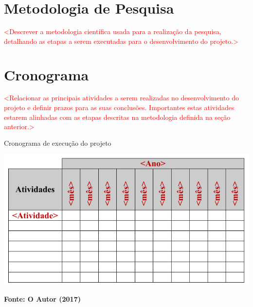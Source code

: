 \documentclass[
	12pt,				%
	openright,			%
	oneside,			%
	a4paper,			%
	chapter=TITLE,		%
	english,			%
	french,				%
	spanish,			%
	brazil				%
	]{abntex2}
\begin{document}
\chapter{Metodologia de Pesquisa}
\label{cap:metodologia}

\textcolor{red}{<Descrever a metodologia científica usada para a realização da pesquisa, detalhando as etapas a serem executadas para o desenvolvimento do projeto.>}

\chapter{Cronograma}
\label{cap:cronograma}

\textcolor{red}{<Relacionar as principais atividades a serem realizadas no desenvolvimento do projeto e definir prazos para as suas conclusões. Importantes estas atividades estarem alinhadas com as etapas descritas na metodologia definida na seção anterior.>}

\begin{table}[!htb]
	\caption{Cronograma de execução do projeto}
	\label{tab:cronograma}
	\centering
	\includegraphics[width=1\textwidth]{cronograma.pdf} \\
	\begin{small}\textbf{Fonte: O Autor (2017)}\end{small}
\end{table}


\postextual


\end{document}
